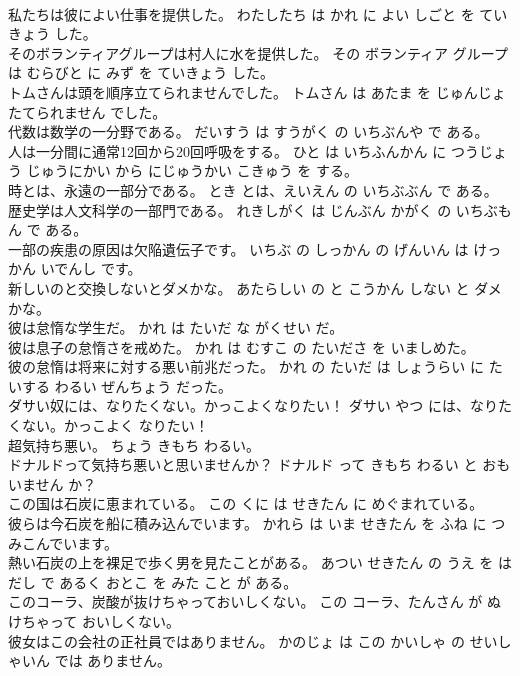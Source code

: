 \documentclass[8pt]{extreport}
\begin{document}
\begin{CJK}{UTF8}{min}
\\	私たちは彼によい仕事を提供した。	わたしたち は かれ に よい しごと を ていきょう した。	
\\	そのボランティアグループは村人に水を提供した。	その ボランティア グループ は むらびと に みず を ていきょう した。	
\\	トムさんは頭を順序立てられませんでした。	トムさん は あたま を じゅんじょ たてられません でした。	
\\	代数は数学の一分野である。	だいすう は すうがく の いちぶんや で ある。	
\\	人は一分間に通常12回から20回呼吸をする。	ひと は いちふんかん に つうじょう じゅうにかい から にじゅうかい こきゅう を する。	
\\	時とは、永遠の一部分である。	とき とは、えいえん の いちぶぶん で ある。	
\\	歴史学は人文科学の一部門である。	れきしがく は じんぶん かがく の いちぶもん で ある。	
\\	一部の疾患の原因は欠陥遺伝子です。	いちぶ の しっかん の げんいん は けっかん いでんし です。	
\\	新しいのと交換しないとダメかな。	あたらしい の と こうかん しない と ダメ かな。	
\\	彼は怠惰な学生だ。	かれ は たいだ な がくせい だ。	
\\	彼は息子の怠惰さを戒めた。	かれ は むすこ の たいださ を いましめた。	
\\	彼の怠惰は将来に対する悪い前兆だった。	かれ の たいだ は しょうらい に たいする わるい ぜんちょう だった。	
\\	ダサい奴には、なりたくない。かっこよくなりたい！	ダサい やつ には、なりたくない。かっこよく なりたい！	
\\	超気持ち悪い。	ちょう きもち わるい。	
\\	ドナルドって気持ち悪いと思いませんか？	ドナルド って きもち わるい と おもいません か？	
\\	この国は石炭に恵まれている。	この くに は せきたん に めぐまれている。	
\\	彼らは今石炭を船に積み込んでいます。	かれら は いま せきたん を ふね に つみこんでいます。	
\\	熱い石炭の上を裸足で歩く男を見たことがある。	あつい せきたん の うえ を はだし で あるく おとこ を みた こと が ある。	
\\	このコーラ、炭酸が抜けちゃっておいしくない。	この コーラ、たんさん が ぬけちゃって おいしくない。	
\\	彼女はこの会社の正社員ではありません。	かのじょ は この かいしゃ の せいしゃいん では ありません。	

\end{CJK}
\end{document}
